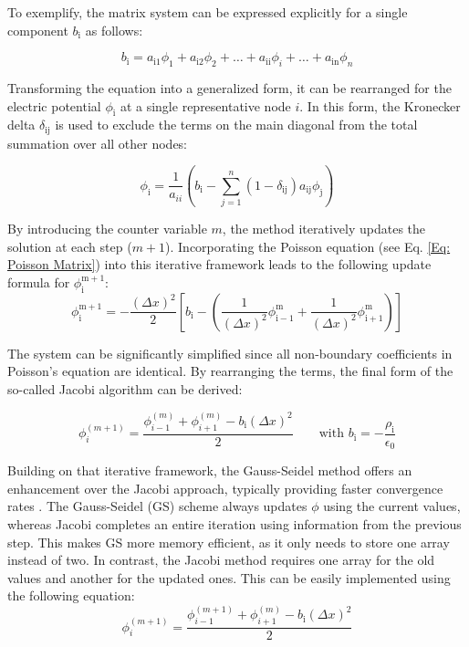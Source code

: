 To exemplify, the matrix system can be expressed explicitly for a single component $b_\mathrm{i}$ as follows:

\begin{equation}
    b_\mathrm{i} = a_{\mathrm{i}1} \phi_1 + a_{\mathrm{i}2} \phi_2 + \dots + a_{\mathrm{ii}} \phi_i + \dots + a_{\mathrm{in}} \phi_n  
\end{equation}

Transforming the equation into a generalized form, it can be rearranged for the electric potential $\phi_\mathrm{i}$ at a single representative node $i$. In this form, the Kronecker delta $\delta_\mathrm{ij}$ is used to exclude the terms on the main diagonal from the total summation over all other nodes:

\begin{equation}
    \phi_\mathrm{i} = \frac{1}{a_{ii}} \left( b_\mathrm{i} - \sum_{j=1}^n (1-\delta_\mathrm{ij}) a_{\mathrm{{ij}}} \phi_\mathrm{j} \right)
\end{equation}

By introducing the counter variable $m$, the method iteratively updates the solution at each step ($m+1$). Incorporating the Poisson equation (see Eq. \ref{Eq: Poisson Matrix}) into this iterative framework leads to the following update formula for $ \phi_\mathrm{i}^{\mathrm{m+1}}$:
\begin{equation}
    \phi_\mathrm{i}^{\mathrm{m+1}} = -\frac{(\Delta x)^2}{2} \left[ b_\mathrm{i} - \left(  \frac{1}{(\Delta x)^2} \phi_\mathrm{i-1}^{\mathrm{m}} + \frac{1}{(\Delta x)^2} \phi_\mathrm{i+1}^{\mathrm{m}}\right)\right]
\end{equation}

The system can be significantly simplified since all non-boundary coefficients in Poisson's equation are identical. By rearranging the terms, the final form of the so-called Jacobi algorithm can be derived:

\begin{equation}
    \phi_i^{(m+1)} = \frac{\phi_{i-1}^{(m)} + \phi_{i+1}^{(m)} - b_\mathrm{i} (\Delta x)^2}{2} \quad \quad \text{with  }b_\mathrm{i}=-\frac{\rho_\mathrm{i}}{\epsilon_0}
\end{equation}

Building on that iterative framework, the Gauss-Seidel method offers an enhancement over the Jacobi approach, typically providing faster convergence rates \cite{brieda_plasma_2019}. The Gauss-Seidel (\acs{GS}) scheme always updates $\phi$ using the current values, whereas Jacobi completes an entire iteration using information from the previous step. This makes \acs{GS} more memory efficient, as it only needs to store one array instead of two. In contrast, the Jacobi method requires one array for the old values and another for the updated ones. This can be easily implemented using the following equation:
\begin{equation}
    \phi_i^{(m+1)} = \frac{\phi_{i-1}^{(m+1)} + \phi_{i+1}^{(m)} - b_\mathrm{i} (\Delta x)^2}{2}
\end{equation}

